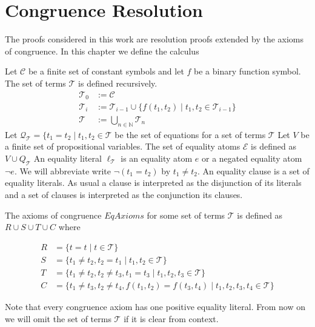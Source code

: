 
\section*{Congruence Resolution}

The proofs considered in this work are resolution proofs \cite{TODO: resolution} extended by the axioms of congruence.
In this chapter we define the calculus 

Let $\mathcal{C}$ be a finite set of constant symbols and let $f$ be a binary function symbol.
The set of terms $\mathcal{T}$ is defined recursively.
\begin{align*}
	\mathcal{T}_0 &:= \mathcal{C} \\
	\mathcal{T}_i &:= \mathcal{T}_{i-1} \cup \{f(t_1,t_2) \mid t_1, t_2 \in \mathcal{T}_{i-1}\} \\
	\mathcal{T} &:= \bigcup_{n \in \mathbb{N}} \mathcal{T}_n
\end{align*}
Let $\mathcal{Q}_{\mathcal{T}} = \{t_1 = t_2 \mid t_1, t_2 \in \mathcal{T}$ be the set of equations for a set of terms $\mathcal{T}$
Let $V$ be a finite set of propositional variables.
The set of equality atoms $\mathcal{E}$ is defined as $V \cup Q_{\mathcal{T}}$
An equality literal $\ell_\mathcal{T}$ is an equality atom $e$ or a negated equality atom $\neg e$.
We will abbreviate write $\neg (t_1 = t_2)$ by $t_1 \neq t_2$.
An equality clause is a set of equality literals.
As usual a clause is interpreted as the disjunction of its literals and a set of clauses is interpreted as the conjunction its clauses.

The axioms of congruence $EqAxioms$ for some set of terms $\mathcal{T}$ is defined as $R \cup S \cup T \cup C$ where

\begin{align*}
	R &= \{ t = t \mid t \in \mathcal{T}\} \\
	S &= \{ t_1 \neq t_2, t_2 = t_1 \mid t_1, t_2 \in \mathcal{T} \} \\
	T &= \{ t_1 \neq t_2, t_2 \neq t_3, t_1 = t_3 \mid t_1, t_2, t_3 \in \mathcal{T} \} \\
	C &= \{ t_1 \neq t_3, t_2 \neq t_4, f(t_1,t_2) = f(t_3,t_4) \mid t_1, t_2, t_3, t_4 \in \mathcal{T} \} 
\end{align*}

Note that every congruence axiom has one positive equality literal.
From now on we will omit the set of terms $\mathcal{T}$ if it is clear from context.

